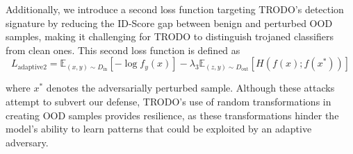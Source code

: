 Additionally, we introduce a second loss function targeting TRODO’s detection signature by reducing the ID-Score gap between benign and perturbed OOD samples, making it challenging for TRODO to distinguish trojaned classifiers from clean ones. This second loss function is defined as
{\small
\[
L_{\text{adaptive2}} = \mathbb{E}_{(x,y) \sim D_{\text{in}}} \left[ -\log f_y(x) \right] - \lambda_3 \mathbb{E}_{(z,y) \sim D_{\text{out}}} \left[ H(f(x); f(x^*)) \right]
\]
}

where \( x^* \) denotes the adversarially perturbed sample. Although these attacks attempt to subvert our defense, TRODO’s use of random transformations in creating OOD samples provides resilience, as these transformations hinder the model’s ability to learn patterns that could be exploited by an adaptive adversary.






